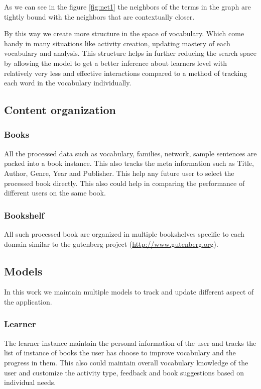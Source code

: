 \documentclass[11pt,a4paper]{article}
\begin{document}
As we can see in the figure \ref{fig:net1} the neighbors of the terms in the
graph are tightly bound with the neighbors that are contextually closer.

By this way we create more structure in the space of vocabulary. Which come
handy in many situations like activity creation, updating mastery of each
vocabulary and analysis. This structure helps in further reducing the search space
by allowing the model to get a better inference about learners level with
relatively very less and effective interactions compared to a method of
tracking each word in the vocabulary individually.


\subsection{Content organization}
\subsubsection{Books}
All the processed data such as vocabulary, families, network, sample sentences
are packed into a book instance. This also tracks the meta information such as
Title, Author, Genre, Year and Publisher. This help any future user to select
the processed book directly. This also could help in comparing the performance
of different users on the same book.

\subsubsection{Bookshelf}
All such processed book are organized in multiple bookshelves specific to each
domain similar to the gutenberg project (\url{http://www.gutenberg.org}).

\subsection{Models}
In this work we maintain multiple models to track and update different aspect
of the application.

\subsubsection{Learner}
The learner instance maintain the personal information of the user and tracks
the list of instance of books the user has choose to improve vocabulary and the
progress in them. This also could maintain overall vocabulary knowledge of
the user and customize the activity type, feedback and book suggestions based
on individual needs.
\end{document}
